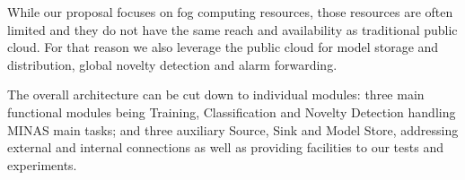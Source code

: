 

While our proposal focuses on fog computing resources, those resources are often limited
and they do not have the same reach and availability as traditional public cloud.
For that reason we also leverage the public cloud for model storage and distribution,
global novelty detection and alarm forwarding.

The overall \mfog architecture can be cut down to individual modules:
three main functional modules being Training, Classification
and Novelty Detection handling MINAS main tasks;
and three auxiliary Source, Sink and Model Store, addressing external and internal connections
as well as providing facilities to our tests and experiments.



